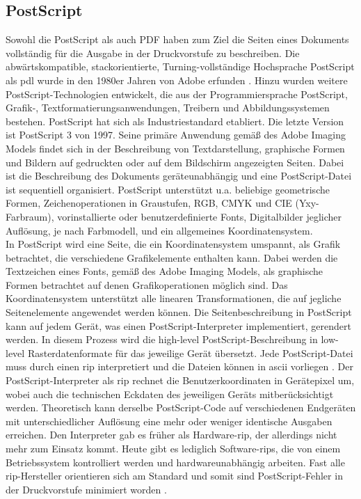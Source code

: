 \subsection{PostScript}
Sowohl die PostScript als auch PDF haben zum Ziel die Seiten eines Dokuments vollständig für die Ausgabe in der Druckvorstufe zu beschreiben. Die abwärtskompatible, stackorientierte, Turning-vollständige Hochsprache PostScript als \gls{pdl} wurde in den 1980er Jahren von Adobe erfunden \cite{adobe-postscript, wiki-postscript}. Hinzu wurden weitere PostScript-Technologien entwickelt, die aus der Programmiersprache PostScript, Grafik-, Textformatierungsanwendungen, Treibern und Abbildungssystemen bestehen. PostScript hat sich als Industriestandard etabliert. Die letzte Version ist PostScript 3 von 1997. Seine primäre Anwendung gemäß des Adobe Imaging Models findet sich in der Beschreibung von Textdarstellung, graphische Formen und Bildern auf gedruckten oder auf dem Bildschirm angezeigten Seiten. Dabei ist die Beschreibung des Dokuments geräteunabhängig und eine PostScript-Datei ist sequentiell organisiert. PostScript unterstützt u.a. beliebige geometrische Formen, Zeichenoperationen in Graustufen, RGB, CMYK und CIE (Yxy-Farbraum), vorinstallierte oder benutzerdefinierte Fonts, Digitalbilder jeglicher Auflösung, je nach Farbmodell, und ein allgemeines Koordinatensystem. \\
In PostScript wird eine Seite, die ein Koordinatensystem umspannt, als Grafik betrachtet, die verschiedene Grafikelemente enthalten kann. Dabei werden die Textzeichen eines Fonts, gemäß des Adobe Imaging Models, als graphische Formen betrachtet auf denen Grafikoperationen möglich sind. Das Koordinatensystem unterstützt alle linearen Transformationen, die auf jegliche Seitenelemente angewendet werden können. Die Seitenbeschreibung in PostScript kann auf jedem Gerät, was einen PostScript-Interpreter implementiert, gerendert werden. In diesem Prozess wird die high-level PostScript-Beschreibung in low-level Rasterdatenformate für das jeweilige Gerät übersetzt. Jede PostScript-Datei muss durch einen \gls{rip} interpretiert und die Dateien können in \gls{ascii} vorliegen \cite{adobe-postscript}. Der PostScript-Interpreter als \gls{rip} rechnet die Benutzerkoordinaten in Gerätepixel um, wobei auch die technischen Eckdaten des jeweiligen Geräts mitberücksichtigt werden. Theoretisch kann derselbe PostScript-Code auf verschiedenen Endgeräten mit unterschiedlicher Auflösung eine mehr oder weniger identische Ausgaben erreichen. Den Interpreter gab es früher als Hardware-\gls{rip}, der allerdings nicht mehr zum Einsatz kommt. Heute gibt es lediglich Software-\gls{rip}s, die von einem Betriebssystem kontrolliert werden und hardwareunabhängig arbeiten. Fast alle \gls{rip}-Hersteller orientieren sich am Standard und somit sind PostScript-Fehler in der Druckvorstufe minimiert worden \cite{schneeberger}.

